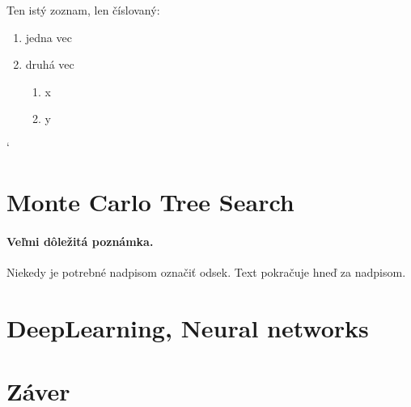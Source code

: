 \documentclass[10pt,twoside,slovak,a4paper]{article}
\begin{document}
Ten istý zoznam, len číslovaný:

\begin{enumerate}
\item jedna vec
\item druhá vec
	\begin{enumerate}
	\item x
	\item y
	\end{enumerate}
\end{enumerate}

`
\section{Monte Carlo Tree Search} \label{MonteCarlo}

\paragraph{Veľmi dôležitá poznámka.}
Niekedy je potrebné nadpisom označiť odsek. Text pokračuje hneď za nadpisom.



\section{DeepLearning, Neural networks} \label{DeepNeural}







\section{Záver} \label{zaver} %






\end{document}
